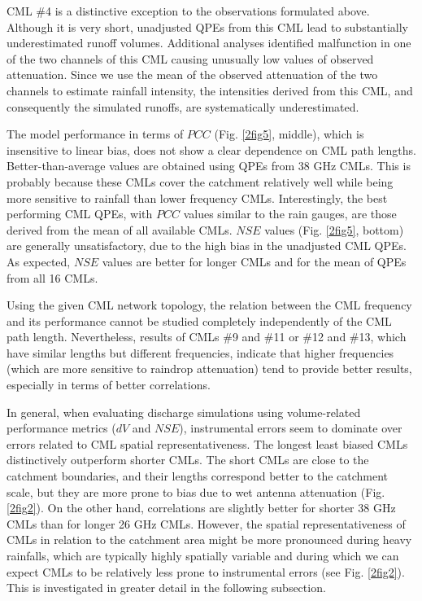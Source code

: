 \documentclass{ctuthesis}\usepackage[]{graphicx}\usepackage[]{color}
\begin{document}
CML \#4 is a distinctive exception to the observations formulated above. Although it is very short, unadjusted QPEs from this CML lead to substantially underestimated runoff volumes. Additional analyses identified malfunction in one of the two channels of this CML causing unusually low values of observed attenuation. Since we use the mean of the observed attenuation of the two channels to estimate rainfall intensity, the intensities derived from this CML, and consequently the simulated runoffs, are systematically underestimated.

The model performance in terms of $PCC$ (Fig. \ref{2fig5}, middle), which is insensitive to linear bias, does not show a clear dependence on CML path lengths. Better-than-average values are obtained using QPEs from 38 GHz CMLs. This is probably because these CMLs cover the catchment relatively well while being more sensitive to rainfall than lower frequency CMLs. Interestingly, the best performing CML QPEs, with $PCC$ values similar to the rain gauges, are those derived from the mean of all available CMLs. $NSE$ values (Fig. \ref{2fig5}, bottom) are generally unsatisfactory, due to the high bias in the unadjusted CML QPEs. As expected, $NSE$ values are better for longer CMLs and for the mean of QPEs from all 16 CMLs.
 
Using the given CML network topology, the relation between the CML frequency and its performance cannot be studied completely independently of the CML path length. Nevertheless, results of CMLs \#9 and \#11 or \#12 and \#13, which have similar lengths but different frequencies, indicate that higher frequencies (which are more sensitive to raindrop attenuation) tend to provide better results, especially in terms of better correlations.
 
In general, when evaluating discharge simulations using volume-related performance metrics ($dV$ and $NSE$), instrumental errors seem to dominate over errors related to CML spatial representativeness. The longest least biased CMLs distinctively outperform shorter CMLs. The short CMLs are close to the catchment boundaries, and their lengths correspond better to the catchment scale, but they are more prone to bias due to wet antenna attenuation (Fig. \ref{2fig2}). On the other hand, correlations are slightly better for shorter 38 GHz CMLs than for longer 26 GHz CMLs. However, the spatial representativeness of CMLs in relation to the catchment area might be more pronounced during heavy rainfalls, which are typically highly spatially variable and during which we can expect CMLs to be relatively less prone to instrumental errors (see Fig. \ref{2fig2}). This is investigated in greater detail in the following subsection.
\end{document}
